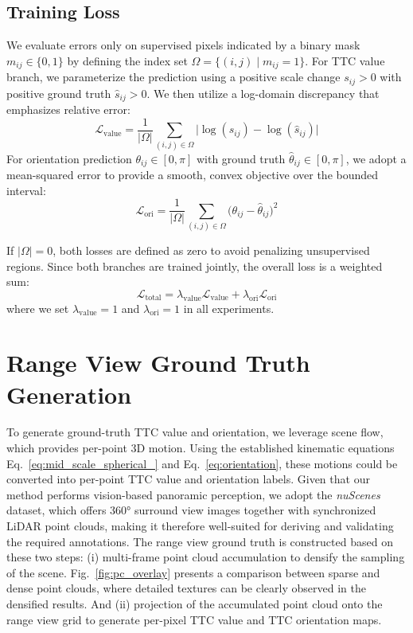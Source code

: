 \documentclass[journal]{IEEEtran}
\begin{document}
\subsection{Training Loss}
\label{sec:loss}
We evaluate errors only on supervised pixels indicated by a binary mask $m_{ij}\in\{0,1\}$ by defining the index set \(\Omega=\{(i,j)\mid m_{ij}=1\}\).
For TTC value branch, we parameterize the prediction using a positive scale change $s_{ij}>0$ with positive ground truth $\hat s_{ij}>0$. We then utilize a log-domain discrepancy that emphasizes relative error:
\begin{equation}
\label{eq:scale_loss}
\mathcal{L}_{\text{value}}
=\frac{1}{|\Omega|}\sum_{(i,j)\in\Omega}
\bigl|\log(s_{ij})-\log(\hat s_{ij})\bigr|
\end{equation}
For orientation prediction $\theta_{ij}\in[0,\pi]$ with ground truth
$\hat\theta_{ij}\in[0,\pi]$, we adopt a mean-squared error to provide a smooth,
convex objective over the bounded interval:
\begin{equation}
\label{eq:orientation_loss}
\mathcal{L}_{\text{ori}}
=\frac{1}{|\Omega|}\sum_{(i,j)\in\Omega}\bigl(\theta_{ij}-\hat\theta_{ij}\bigr)^2
\end{equation}

If $|\Omega|=0$, both losses are defined as zero to avoid penalizing unsupervised regions. Since both branches are trained jointly, the overall loss is a weighted sum:
\begin{equation}
\label{eq:total_loss}
\mathcal{L}_{\text{total}}
=\lambda_{\text{value}}\mathcal{L}_{\text{value}} + \lambda_{\text{ori}}\mathcal{L}_{\text{ori}}
\end{equation}
where we set \(\lambda_{\text{value}}=1\) and \(\lambda_{\text{ori}}=1\) in all experiments.

\section{Range View Ground Truth Generation}
\label{sec:rv_gt}
To generate ground-truth TTC value and orientation, we leverage scene flow, which provides per-point 3D motion. Using the established kinematic equations Eq.~\ref{eq:mid_scale_spherical_} and Eq.~\ref{eq:orientation}, these motions could be converted into per-point TTC value and orientation labels. Given that our method performs vision-based panoramic perception, we adopt the \textit{nuScenes}~\cite{caesar2020nusc} dataset, which offers 360° surround view images together with synchronized LiDAR point clouds, making it therefore well-suited for deriving and validating the required annotations. The range view ground truth is constructed based on these two steps: (i) multi-frame point cloud accumulation to densify the sampling of the scene. Fig.~\ref{fig:pc_overlay} presents a comparison between sparse and dense point clouds, where detailed textures can be clearly observed in the densified results. And (ii) projection of the accumulated point cloud onto the range view grid to generate per-pixel TTC value and TTC orientation maps.
\end{document}

